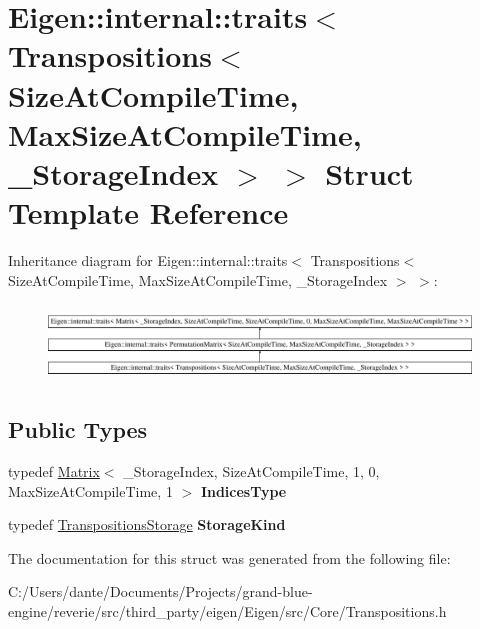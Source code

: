 \hypertarget{struct_eigen_1_1internal_1_1traits_3_01_transpositions_3_01_size_at_compile_time_00_01_max_size_a3e3a58d21bfa7053a385355887ee81d}{}\section{Eigen\+::internal\+::traits$<$ Transpositions$<$ Size\+At\+Compile\+Time, Max\+Size\+At\+Compile\+Time, \+\_\+\+Storage\+Index $>$ $>$ Struct Template Reference}
\label{struct_eigen_1_1internal_1_1traits_3_01_transpositions_3_01_size_at_compile_time_00_01_max_size_a3e3a58d21bfa7053a385355887ee81d}
Inheritance diagram for Eigen\+::internal\+::traits$<$ Transpositions$<$ Size\+At\+Compile\+Time, Max\+Size\+At\+Compile\+Time, \+\_\+\+Storage\+Index $>$ $>$\+:\begin{figure}[H]
\begin{center}
\leavevmode
\includegraphics[height=2.036364cm]{struct_eigen_1_1internal_1_1traits_3_01_transpositions_3_01_size_at_compile_time_00_01_max_size_a3e3a58d21bfa7053a385355887ee81d}
\end{center}
\end{figure}
\subsection*{Public Types}
\begin{DoxyCompactItemize}
\item 
\mbox{\label{struct_eigen_1_1internal_1_1traits_3_01_transpositions_3_01_size_at_compile_time_00_01_max_size_a3e3a58d21bfa7053a385355887ee81d_a5e14855a658b38c00a6ec76c6ea80740}} 
typedef \mbox{\hyperlink{class_eigen_1_1_matrix}{Matrix}}$<$ \+\_\+\+Storage\+Index, Size\+At\+Compile\+Time, 1, 0, Max\+Size\+At\+Compile\+Time, 1 $>$ {\bfseries Indices\+Type}
\item 
\mbox{\label{struct_eigen_1_1internal_1_1traits_3_01_transpositions_3_01_size_at_compile_time_00_01_max_size_a3e3a58d21bfa7053a385355887ee81d_a8c7c6257ce259676efa40a7327f796f4}} 
typedef \mbox{\hyperlink{struct_eigen_1_1_transpositions_storage}{Transpositions\+Storage}} {\bfseries Storage\+Kind}
\end{DoxyCompactItemize}


The documentation for this struct was generated from the following file\+:\begin{DoxyCompactItemize}
\item 
C\+:/\+Users/dante/\+Documents/\+Projects/grand-\/blue-\/engine/reverie/src/third\+\_\+party/eigen/\+Eigen/src/\+Core/Transpositions.\+h\end{DoxyCompactItemize}
